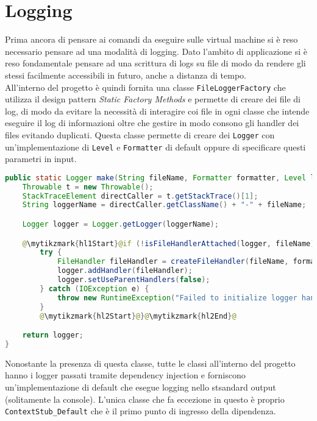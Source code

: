 \section{Logging}
Prima ancora di pensare ai comandi da eseguire sulle virtual machine si è reso necessario pensare ad una modalità di logging. Dato l'ambito di applicazione si è reso fondamentale pensare ad una scrittura di logs su file di modo da rendere gli stessi facilmente accessibili in futuro, anche a distanza di tempo.\\
All'interno del progetto è quindi fornita una classe \texttt{FileLoggerFactory} che utilizza il design pattern \emph{Static Factory Methods} \cite{effectiveJava} e permette di creare dei file di log, di modo da evitare la necessità di interagire coi file in ogni classe che intende eseguire il log di informazioni oltre che gestire in modo consono gli handler dei files evitando duplicati. Questa classe permette di creare dei \texttt{Logger} con un'implementazione di \texttt{Level} e \texttt{Formatter} di default oppure di specificare questi parametri in input.\\
\begin{lstlisting}[language=Java, caption=Metodo make di FileLoggerFactory, label=code:FileLoggerFactoryMake]
public static Logger make(String fileName, Formatter formatter, Level level) {
    Throwable t = new Throwable();
    StackTraceElement directCaller = t.getStackTrace()[1];
    String loggerName = directCaller.getClassName() + "-" + fileName;

    Logger logger = Logger.getLogger(loggerName);

    @\mytikzmark{hl1Start}@if (!isFileHandlerAttached(logger, fileName)) {@\mytikzmark{hl1End}@
        try {
            FileHandler fileHandler = createFileHandler(fileName, formatter, level);
            logger.addHandler(fileHandler);
            logger.setUseParentHandlers(false);
        } catch (IOException e) {
            throw new RuntimeException("Failed to initialize logger handler.", e);
        }
        @\mytikzmark{hl2Start}@}@\mytikzmark{hl2End}@

    return logger;
}
    \end{lstlisting}
Nonostante la presenza di questa classe, tutte le classi all'interno del progetto hanno i logger passati tramite dependency injection e forniscono un'implementazione di default che esegue logging nello stsandard output (solitamente la console). L'unica classe che fa eccezione in questo è proprio \texttt{ContextStub\_Default} che è il primo punto di ingresso della dipendenza.\\
